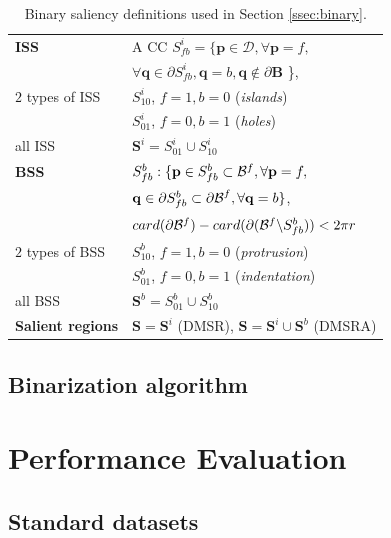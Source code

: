 \documentclass{article}
\def\B{{\mathbf B}}
\def\mcD{{\mathcal{D}}}
\def\p{{\mathbf p}}
\def\q{{\mathbf q}}
\def\S{{\mathbf S}}
\begin{document}
\begin{table}[hbt]
\begin{minipage}[b]{0.48\linewidth}\begin{tabular}{|l l|}
\hline
{\bf ISS} & A CC $S^i_{fb} = \{\p \in \mcD, \forall \p=f,$\\&$\forall \q \in \partial S^i_{fb}, \q=b, \q \notin \partial \B $ \},\\
$2$ types of ISS & $S^i_{10}$, $f=1, b=0$ ({\em islands})\\
& $S^i_{01}$, $f=0, b=1$  ({\em holes})\\
all ISS &$\S^i = S_{01}^i \cup S_{10}^i$\\
{\bf BSS} &  $S_{fb}^b: \{\p \in S_{fb}^b \subset{\cal B}^f, \forall \p = f,$\\&$ \q \in \partial S_{fb}^b \subset {\partial \cal B}^f,\forall \q = b \}$, \\
& $card(\partial {\cal B}^f) - card(\partial ({\cal B}^f \backslash S_{fb}^b)) < 2 \pi r$\\
$2$ types of BSS & $S^b_{10}$, $f=1, b=0$ ({\em protrusion})\\
& $S^b_{01}$, $f=0, b=1$ ({\em indentation})\\
all BSS& $\S^b = S_{01}^b \cup S_{10}^b$\\
{\bf Salient regions} &  $\S = \S^i$ (DMSR), $\S = \S^i \cup \S^b$ (DMSRA)  \\
\hline
\end{tabular}
\caption{Binary saliency definitions used in Section \ref{ssec:binary}.}\label{table:binary_sal}
\end{minipage}
\end{table}



\subsection{Binarization algorithm}
\label{ssec:binarize}



\section{Performance  Evaluation}
\label{sec:perf}

\subsection{Standard datasets}
\label{ssec:standart}
\end{document}
